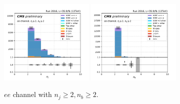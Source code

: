 \begin{figure}[ht]
    \includegraphics[width=0.4\textwidth]{chapters/Analysis/sectionPlots/figures/kinematics_pickles/ee/2b/ee_2b_nJets.pdf}
    \includegraphics[width=0.4\textwidth]{chapters/Analysis/sectionPlots/figures/kinematics_pickles/ee/2b/ee_2b_nBJets.pdf}
    
    \caption{$ee$ channel with $n_j\geq2, n_b\geq2$.}
\end{figure}

